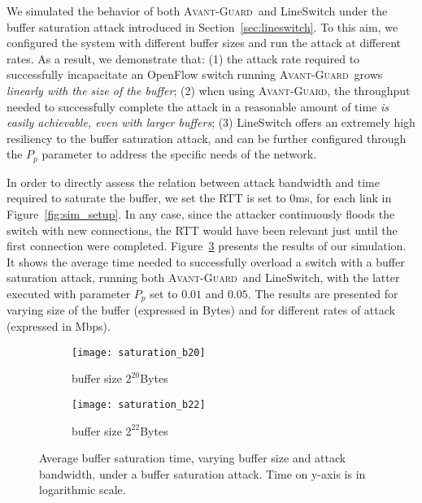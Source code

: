 \documentclass{sig-alternate}
\newcommand{\avantguard}{\textsc{Avant-Guard}}
\begin{document}
We simulated the behavior of both \avantguard~and LineSwitch under the buffer saturation attack introduced in Section~\ref{sec:lineswitch}.
To this aim, we configured the system with different buffer sizes and run the attack at different rates. 
As a result, we demonstrate that: (1) the attack rate required to successfully incapacitate an OpenFlow switch running \avantguard~grows {\em linearly with the size of the buffer}; (2) when using \avantguard, the throughput needed to successfully complete the attack in a reasonable amount of time {\em is easily achievable, even with larger buffers}; (3) LineSwitch offers an extremely high resiliency to the buffer saturation attack, and can be further configured through the $P_p$ parameter to address the specific needs of the network.

In order to directly assess the relation between attack bandwidth and time required to saturate the buffer, we set the RTT is set to 0ms, for each link in Figure~\ref{fig:sim_setup}.
In any case, since the attacker continuously floods the switch with new connections, the RTT would have been relevant just until the first connection were completed.
Figure~\ref{fig:time_saturation} presents the results of our simulation. It shows the average time needed to successfully overload a switch with a buffer saturation attack, running both \avantguard~and LineSwitch, with the latter executed with parameter $P_p$ set to $0.01$ and $0.05$. 
The results are presented for varying size of the buffer (expressed in Bytes) and for different rates of attack (expressed in Mbps).

\begin{figure}[h!t]
	    \centering
		\begin{subfigure}{0.49\columnwidth}
			\centering
			\texttt{[image: saturation\_b20]}
			\caption{buffer size $2^{20}$Bytes}
			\label{fig:graph20}
		\end{subfigure}
		\begin{subfigure}{0.49\columnwidth}
			\centering
			\texttt{[image: saturation\_b22]}
			\caption{buffer size $2^{22}$Bytes}
			\label{fig:graph22}
		\end{subfigure}
		\caption{Average buffer saturation time, varying buffer size and attack bandwidth, under a buffer saturation attack. Time on y-axis is in logarithmic scale.}\label{fig:time_saturation}
	\end{figure}
\end{document}
